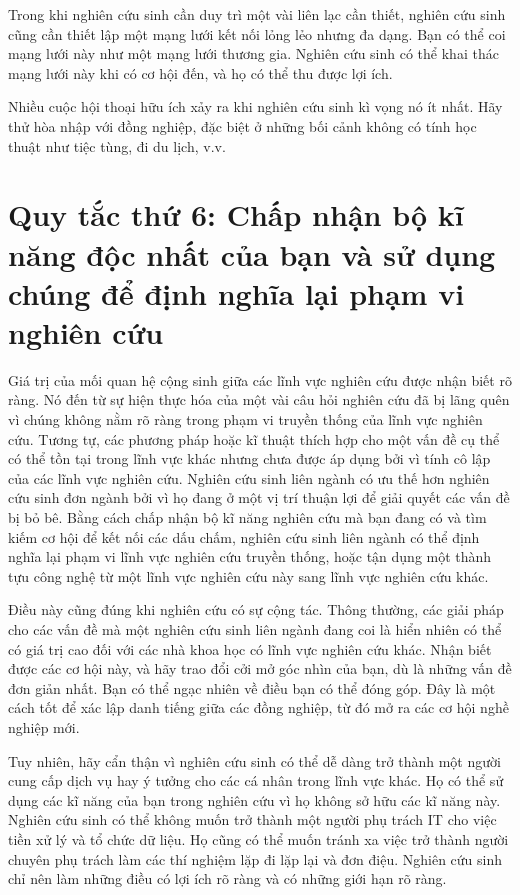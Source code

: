 \documentclass[12pt]{report}
\begin{document}
Trong khi nghiên cứu sinh cần duy trì một vài liên lạc cần thiết, nghiên cứu sinh cũng cần thiết lập một mạng lưới kết nối lỏng lẻo nhưng đa dạng. Bạn có thể coi mạng lưới này như một mạng lưới thương gia. Nghiên cứu sinh có thể khai thác mạng lưới này khi có cơ hội đến, và họ có thể thu được lợi ích.

Nhiều cuộc hội thoại hữu ích xảy ra khi nghiên cứu sinh kì vọng nó ít nhất. Hãy thử hòa nhập với đồng nghiệp, đặc biệt ở những bối cảnh không có tính học thuật như tiệc tùng, đi du lịch, v.v.

\section{Quy tắc thứ 6: Chấp nhận bộ kĩ năng độc nhất của bạn và sử dụng chúng để định nghĩa lại phạm vi nghiên cứu}

Giá trị của mối quan hệ cộng sinh giữa các lĩnh vực nghiên cứu được nhận biết rõ ràng. Nó đến từ sự hiện thực hóa của một vài câu hỏi nghiên cứu đã bị lãng quên vì chúng không nằm rõ ràng trong phạm vi truyền thống của lĩnh vực nghiên cứu. Tương tự, các phương pháp hoặc kĩ thuật thích hợp cho một vấn đề cụ thể có thể tồn tại trong lĩnh vực khác nhưng chưa được áp dụng bởi vì tính cô lập của các lĩnh vực nghiên cứu. Nghiên cứu sinh liên ngành có ưu thế hơn nghiên cứu sinh đơn ngành bởi vì họ đang ở một vị trí thuận lợi để giải quyết các vấn đề bị bỏ bê. Bằng cách chấp nhận bộ kĩ năng nghiên cứu mà bạn đang có và tìm kiếm cơ hội để kết nối các dấu chấm, nghiên cứu sinh liên ngành có thể định nghĩa lại phạm vi lĩnh vực nghiên cứu truyền thống, hoặc tận dụng một thành tựu công nghệ từ một lĩnh vực nghiên cứu này sang lĩnh vực nghiên cứu khác.

Điều này cũng đúng khi nghiên cứu có sự cộng tác. Thông thường, các giải pháp cho các vấn đề mà một nghiên cứu sinh liên ngành đang coi là hiển nhiên có thể có giá trị cao đối với các nhà khoa học có lĩnh vực nghiên cứu khác. Nhận biết được các cơ hội này, và hãy trao đổi cởi mở góc nhìn của bạn, dù là những vấn đề đơn giản nhất. Bạn có thể ngạc nhiên về điều bạn có thể đóng góp. Đây là một cách tốt để xác lập danh tiếng giữa các đồng nghiệp, từ đó mở ra các cơ hội nghề nghiệp mới.

Tuy nhiên, hãy cẩn thận vì nghiên cứu sinh có thể dễ dàng trở thành một người cung cấp dịch vụ hay ý tưởng cho các cá nhân trong lĩnh vực khác. Họ có thể sử dụng các kĩ năng của bạn trong nghiên cứu vì họ không sở hữu các kĩ năng này. Nghiên cứu sinh có thể không muốn trở thành một người phụ trách IT cho việc tiền xử lý và tổ chức dữ liệu. Họ cũng có thể muốn tránh xa việc trở thành người chuyên phụ trách làm các thí nghiệm lặp đi lặp lại và đơn điệu. Nghiên cứu sinh chỉ nên làm những điều có lợi ích rõ ràng và có những giới hạn rõ ràng.
\end{document}

